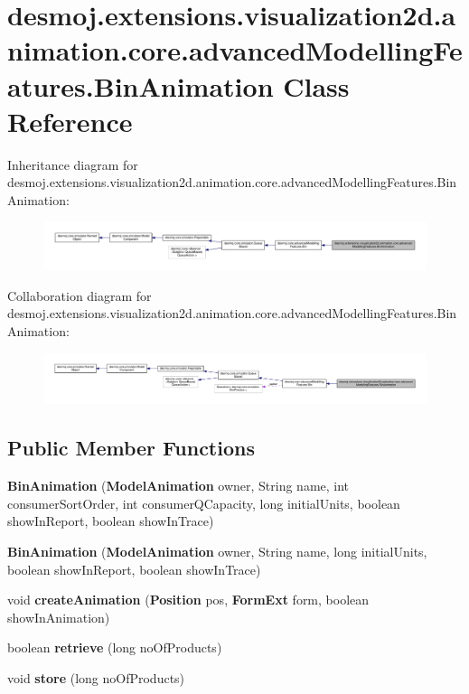 \section{desmoj.\-extensions.\-visualization2d.\-animation.\-core.\-advanced\-Modelling\-Features.\-Bin\-Animation Class Reference}
\label{classdesmoj_1_1extensions_1_1visualization2d_1_1animation_1_1core_1_1advanced_modelling_features_1_1_bin_animation}


Inheritance diagram for desmoj.\-extensions.\-visualization2d.\-animation.\-core.\-advanced\-Modelling\-Features.\-Bin\-Animation\-:
\nopagebreak
\begin{figure}[H]
\begin{center}
\leavevmode
\includegraphics[width=350pt]{classdesmoj_1_1extensions_1_1visualization2d_1_1animation_1_1core_1_1advanced_modelling_featuresf68be2c142e705b746ea43dc8abec8c1}
\end{center}
\end{figure}


Collaboration diagram for desmoj.\-extensions.\-visualization2d.\-animation.\-core.\-advanced\-Modelling\-Features.\-Bin\-Animation\-:
\nopagebreak
\begin{figure}[H]
\begin{center}
\leavevmode
\includegraphics[width=350pt]{classdesmoj_1_1extensions_1_1visualization2d_1_1animation_1_1core_1_1advanced_modelling_features_1_1_bin_animation__coll__graph}
\end{center}
\end{figure}
\subsection*{Public Member Functions}
\begin{DoxyCompactItemize}
\item 
{\bf Bin\-Animation} ({\bf Model\-Animation} owner, String name, int consumer\-Sort\-Order, int consumer\-Q\-Capacity, long initial\-Units, boolean show\-In\-Report, boolean show\-In\-Trace)
\item 
{\bf Bin\-Animation} ({\bf Model\-Animation} owner, String name, long initial\-Units, boolean show\-In\-Report, boolean show\-In\-Trace)
\item 
void {\bf create\-Animation} ({\bf Position} pos, {\bf Form\-Ext} form, boolean show\-In\-Animation)
\item 
boolean {\bf retrieve} (long no\-Of\-Products)
\item 
void {\bf store} (long no\-Of\-Products)
\end{DoxyCompactItemize}
